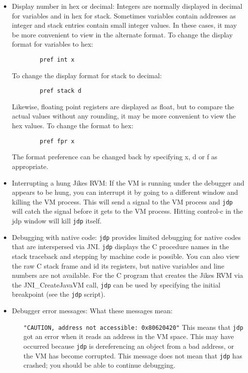 \begin{itemize}
\item Display number in hex or decimal:
  Integers are normally displayed in decimal for variables and
  in hex for stack.  Sometimes variables contain addresses as 
  integer and stack entries contain small integer values.    In
  these cases, it may be more convenient to view in the alternate
  format.
  To change the display format for variables to hex:
\begin{verbatim}
        pref int x
\end{verbatim}
  To change the display format for stack to decimal:
\begin{verbatim}
        pref stack d
\end{verbatim}
  Likewise, floating point registers are displayed as float, but
  to compare the actual values without any rounding, it may be more
  convenient to view the hex values.  To change the format to hex:
\begin{verbatim}
        pref fpr x
\end{verbatim}

  The format preference can be changed back by specifying x, d or f
  as appropriate.

\item Interrupting a hung Jikes RVM:  If the VM is running under the debugger
  and appears to be hung, you can interrupt it by going to a different
  window and killing the VM process.  This will send a signal to the
  VM process and {\tt jdp} will catch the signal before it gets to
  the VM process.  Hitting control-c in the jdp window will kill 
  {\tt jdp} itself.


\item Debugging with native code:  {\tt jdp} provides limited debugging
  for native codes that are interspersed via JNI.  {\tt jdp}
  displays the C procedure names in the stack traceback and stepping by 
  machine code is possible.  You can also view the raw C stack frame and 
id  its registers, but native variables and line numbers are not available.
  For the C program that creates the Jikes RVM via the JNI\_CreateJavaVM call, 
  {\tt jdp} can be used by specifying the initial breakpoint (see the 
  {\tt jdp} script).




\item Debugger error messages:
  What these messages mean:

\begin{itemize}
\item [{\tt "CAUTION, address not accessible: 0x80620420"}]
        This means that {\tt jdp} got an error when it reads an address
        in the VM space.  This may have occurred because {\tt jdp} is 
        dereferencing an object from a bad address, or the VM has
        become corrupted.  This message does not mean that {\tt jdp}
        has crashed; you should be able to continue debugging.


\end{itemize}
\end{itemize}
